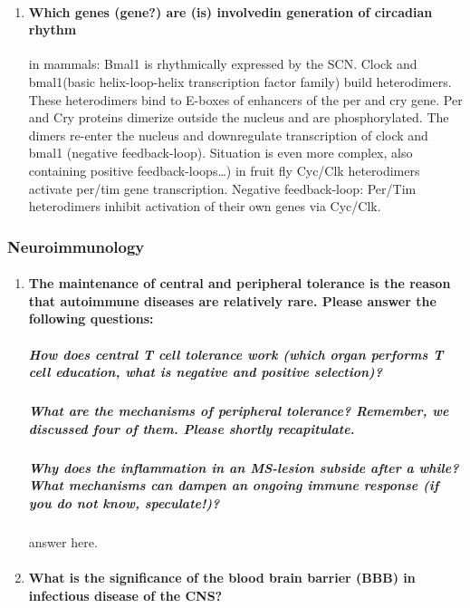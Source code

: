 \documentclass[12pt,article,oneside,a4paper]{memoir}
\begin{document}
\begin{enumerate}
\item \paragraph{Which genes (gene?) are (is) involvedin generation of circadian rhythm}

in mammals: Bmal1 is rhythmically expressed by the SCN. Clock and bmal1(basic helix-loop-helix transcription factor family) build heterodimers. These heterodimers bind to E-boxes of enhancers of the per and cry gene. Per and Cry proteins dimerize outside the nucleus and are phosphorylated. The dimers re-enter the nucleus and downregulate transcription of  clock and bmal1 (negative feedback-loop). Situation is even more complex, also containing positive feedback-loops…)
        in fruit fly Cyc/Clk heterodimers activate per/tim gene transcription. Negative feedback-loop: Per/Tim heterodimers inhibit activation of their own genes via Cyc/Clk.
\end{enumerate}

\subsubsection{Neuroimmunology}
\begin{enumerate}
\item \paragraph{The maintenance of central and peripheral tolerance is the reason that autoimmune diseases are relatively rare. Please answer the following questions:}
\subparagraph{How does central T cell tolerance work (which organ performs T cell education, what is negative and positive selection)?}
\subparagraph{What are the mechanisms of peripheral tolerance? Remember, we discussed four of them. Please shortly recapitulate.}
\subparagraph{Why does the inflammation in an MS-lesion subside after a while? What mechanisms can dampen an ongoing immune response (if you do not know,
speculate!)?} answer here.
\item \paragraph{What is the significance of the blood brain barrier (BBB) in infectious disease of the CNS?}
\end{enumerate}
\end{document}
